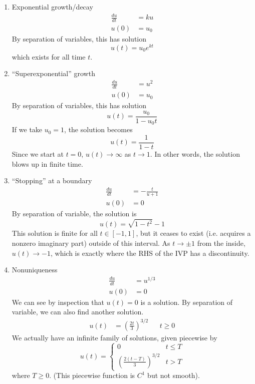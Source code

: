 \documentclass{article}
\begin{document}
\begin{enumerate}

\item Exponential growth/decay
\begin{align*}
\frac{du}{dt} &= k u \\
u(0) &= u_0 
\end{align*}
By separation of variables, this has solution
\[
u(t) = u_0 e^{kt}
\]
which exists for all time $t$.

\item ``Superexponential'' growth
\begin{align*}
\frac{du}{dt} &= u^2 \\
u(0) &= u_0
\end{align*}
By separation of variables, this has solution
\[
u(t) = \frac{u_0}{1 - u_0 t}
\]
If we take $u_0 = 1$, the solution becomes
\[
u(t) = \frac{1}{1 - t}
\]
Since we start at $t = 0$, $u(t) \rightarrow \infty$ as $t \rightarrow 1$. In other words, the solution blows up in finite time.

\item ``Stopping'' at a boundary
\begin{align*}
\frac{du}{dt} &= -\frac{t}{u+1} \\
u(0) &= 0
\end{align*}
By separation of variable, the solution is
\[
u(t) = \sqrt{1 - t^2} - 1
\]
This solution is finite for all $t \in [-1, 1]$, but it ceases to exist (i.e. acquires a nonzero imaginary part) outside of this interval. As $t \rightarrow \pm 1$ from the inside, $u(t) \rightarrow -1$, which is exactly where the RHS of the IVP has a discontinuity.

\item Nonuniqueness
\begin{align*}
\frac{du}{dt} &= u^{1/3} \\
u(0) &= 0
\end{align*}
We can see by inspection that $u(t) = 0$ is a solution. By separation of variable, we can also find another solution.
\begin{align*}
u(t) &= \left( \frac{2t}{3} \right)^{3/2} && t \geq 0
\end{align*}
We actually have an infinite family of solutions, given piecewise by
\[
u(t) = \begin{cases}
0 & t \leq T \\
\left( \frac{2(t-T)}{3} \right)^{3/2} & t > T
\end{cases}
\]
where $T \geq 0$. (This piecewise function is $C^1$ but not smooth).
\end{enumerate}
\end{document}

